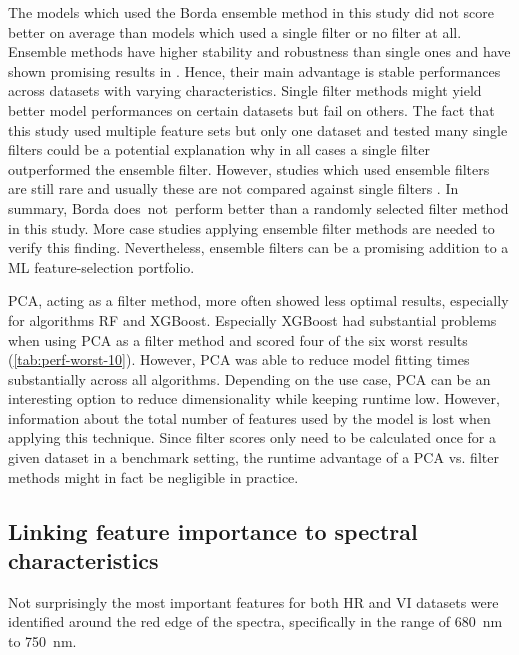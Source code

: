 \documentclass[remotesensing,article,submit,moreauthors,pdftex]{Definitions/mdpi}
\begin{document}
The models which used the Borda ensemble method in this study did not score better on average than models which used a single filter or no filter at all.
Ensemble methods have higher stability and robustness than single ones and have shown promising results in \cite{drotar2017}.
Hence, their main advantage is stable performances across datasets with varying characteristics.
Single filter methods might yield better model performances on certain datasets but fail on others.
The fact that this study used multiple feature sets but only one dataset and tested many single filters could be a potential explanation why in all cases a single filter outperformed the ensemble filter.
However, studies which used ensemble filters are still rare and usually these are not compared against single filters \cite{ghosh2019}.
In summary, Borda does\ not\ perform better than a randomly selected filter method in this study.
More case studies applying ensemble filter methods are needed to verify this finding.
Nevertheless, ensemble filters can be a promising addition to a ML feature-selection portfolio.

PCA, acting as a filter method, more often showed less optimal results, especially for algorithms RF and XGBoost.
Especially XGBoost had substantial problems when using PCA as a filter method and scored four of the six worst results (\autoref{tab:perf-worst-10}).
However, PCA was able to reduce model fitting times substantially across all algorithms.
Depending on the use case, PCA can be an interesting option to reduce dimensionality while keeping runtime low.
However, information about the total number of features used by the model is lost when applying this technique.
Since filter scores only need to be calculated once for a given dataset in a benchmark setting, the runtime advantage of a PCA vs. filter methods might in fact be negligible in practice.

\subsection{Linking feature importance to spectral characteristics}

Not surprisingly the most important features for both HR and VI datasets were identified around the red edge of the spectra, specifically in the range of 680~nm to 750~nm.
\end{document}
